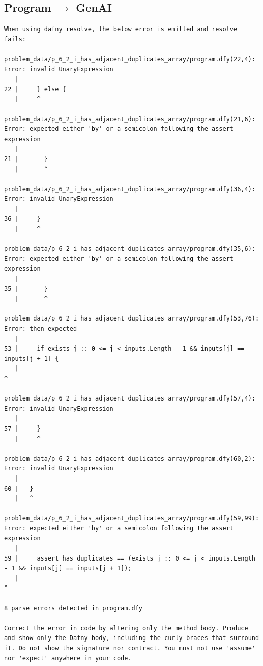 \documentclass{article}
\begin{document}
\subsection*{Program $\rightarrow$ GenAI}
\begin{lstlisting}
When using dafny resolve, the below error is emitted and resolve fails:

problem_data/p_6_2_i_has_adjacent_duplicates_array/program.dfy(22,4): Error: invalid UnaryExpression
   |
22 |     } else {
   |     ^

problem_data/p_6_2_i_has_adjacent_duplicates_array/program.dfy(21,6): Error: expected either 'by' or a semicolon following the assert expression
   |
21 |       }
   |       ^

problem_data/p_6_2_i_has_adjacent_duplicates_array/program.dfy(36,4): Error: invalid UnaryExpression
   |
36 |     }
   |     ^

problem_data/p_6_2_i_has_adjacent_duplicates_array/program.dfy(35,6): Error: expected either 'by' or a semicolon following the assert expression
   |
35 |       }
   |       ^

problem_data/p_6_2_i_has_adjacent_duplicates_array/program.dfy(53,76): Error: then expected
   |
53 |     if exists j :: 0 <= j < inputs.Length - 1 && inputs[j] == inputs[j + 1] {
   |                                                                             ^

problem_data/p_6_2_i_has_adjacent_duplicates_array/program.dfy(57,4): Error: invalid UnaryExpression
   |
57 |     }
   |     ^

problem_data/p_6_2_i_has_adjacent_duplicates_array/program.dfy(60,2): Error: invalid UnaryExpression
   |
60 |   }
   |   ^

problem_data/p_6_2_i_has_adjacent_duplicates_array/program.dfy(59,99): Error: expected either 'by' or a semicolon following the assert expression
   |
59 |     assert has_duplicates == (exists j :: 0 <= j < inputs.Length - 1 && inputs[j] == inputs[j + 1]);
   |                                                                                                    ^

8 parse errors detected in program.dfy

Correct the error in code by altering only the method body. Produce and show only the Dafny body, including the curly braces that surround it. Do not show the signature nor contract. You must not use 'assume' nor 'expect' anywhere in your code.
\end{lstlisting}
\end{document}

